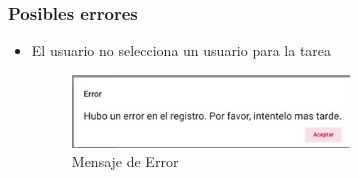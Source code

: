             \subsubsection{Posibles errores}

                \begin{itemize}
                    \item El usuario no selecciona un usuario para la tarea
                    \begin{figure}[H]
                    \centering
                    \hypertarget{error}{\includegraphics[width=0.7\linewidth]{images/Tareas/Error}}
                    \caption{Mensaje de Error}
                    \label{error}
                    \end{figure}
                \end{itemize}


